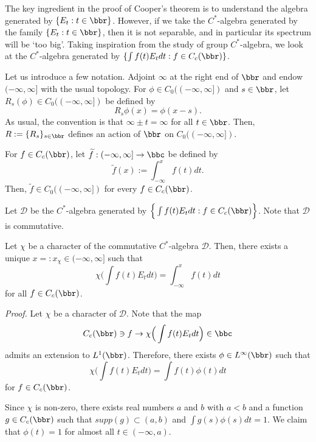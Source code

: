 The key ingredient in the proof of Cooper's theorem is to understand the algebra generated by $\{E_t:t \in \bbr\}$. However, if we take the $C^{*}$-algebra generated by the family $\{E_t: t \in \bbr\}$, then it is not separable, and in particular its spectrum
will be `too big'. Taking inspiration from the study of group $C^{*}$-algebra, we look at the $C^{*}$-algebra generated by $\{\int f(t)E_t dt: f \in C_{c}(\bbr)\}$. 

Let us introduce a few notation. Adjoint $\infty$ at the right end of $\bbr$ and endow $(-\infty,\infty]$ with the usual topology. For $\phi \in C_0((-\infty,\infty])$ and $s \in \bbr$, let $R_s(\phi) \in C_{0}((-\infty,\infty])$ be defined by 
\[
R_s\phi(x)=\phi(x-s).\]
As usual, the convention is that $\infty\pm t=\infty$ for all $t \in \bbr$. Then, $R:=\{R_s\}_{s \in \bbr}$ defines an action of $\bbr$ on $C_0((-\infty,\infty])$. 


For $f \in C_{c}(\bbr)$, let $\widetilde{f}:(-\infty,\infty] \to \bbc$ be defined by 
\[
\widetilde{f}(x):=\int_{-\infty}^{x}f(t)dt.\]
Then, $\widetilde{f} \in C_0((-\infty,\infty])$ for every $f \in C_{c}(\bbr)$. 

Let $\mathcal{D}$ be the $C^{*}$-algebra generated by $\Big \{\int f(t)E_t dt: f \in C_{c}(\bbr)\Big\}$. Note that $\mathcal{D}$ is commutative. %

\begin{lmma}
\label{description of characters}
Let $\chi$ be a character of the commutative $C^{*}$-algebra $\mathcal{D}$. Then, there exists a unique $x=:x_{\chi} \in (-\infty,\infty]$ such that 
\[
\chi\Big(\int f(t)E_tdt\Big)=\int_{-\infty}^{x}f(t)dt\]
for all $f \in C_{c}(\bbr)$. 
\end{lmma}
\textit{Proof.} Let $\chi$ be a character of $\mathcal{D}$. Note that the map 
\[
C_{c}(\bbr) \ni f \to \chi\Big(\int f(t)E_tdt\Big) \in \bbc\]
admits an extension to $L^{1}(\bbr)$. Therefore, there exists $\phi \in L^{\infty}(\bbr)$ such that 
\[
\chi\Big(\int f(t)E_tdt\Big)=\int f(t)\phi(t)dt\]
for $f \in C_{c}(\bbr)$. 

Since $\chi$ is non-zero, there exists real numbers $a$ and $b$ with $a<b$ and a function $g \in C_{c}(\bbr)$ such that $supp(g) \subset (a,b)$ and $\int g(s)\phi(s)dt=1$. 
We claim that $\phi(t)=1$ for almost all $t \in (-\infty,a)$. 

